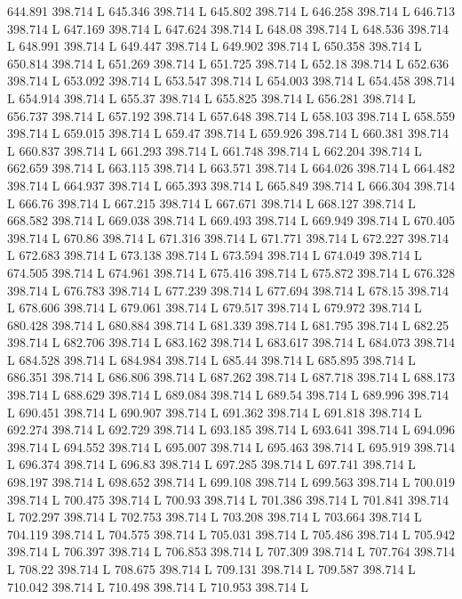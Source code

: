 644.891 398.714 L
645.346 398.714 L
645.802 398.714 L
646.258 398.714 L
646.713 398.714 L
647.169 398.714 L
647.624 398.714 L
648.08 398.714 L
648.536 398.714 L
648.991 398.714 L
649.447 398.714 L
649.902 398.714 L
650.358 398.714 L
650.814 398.714 L
651.269 398.714 L
651.725 398.714 L
652.18 398.714 L
652.636 398.714 L
653.092 398.714 L
653.547 398.714 L
654.003 398.714 L
654.458 398.714 L
654.914 398.714 L
655.37 398.714 L
655.825 398.714 L
656.281 398.714 L
656.737 398.714 L
657.192 398.714 L
657.648 398.714 L
658.103 398.714 L
658.559 398.714 L
659.015 398.714 L
659.47 398.714 L
659.926 398.714 L
660.381 398.714 L
660.837 398.714 L
661.293 398.714 L
661.748 398.714 L
662.204 398.714 L
662.659 398.714 L
663.115 398.714 L
663.571 398.714 L
664.026 398.714 L
664.482 398.714 L
664.937 398.714 L
665.393 398.714 L
665.849 398.714 L
666.304 398.714 L
666.76 398.714 L
667.215 398.714 L
667.671 398.714 L
668.127 398.714 L
668.582 398.714 L
669.038 398.714 L
669.493 398.714 L
669.949 398.714 L
670.405 398.714 L
670.86 398.714 L
671.316 398.714 L
671.771 398.714 L
672.227 398.714 L
672.683 398.714 L
673.138 398.714 L
673.594 398.714 L
674.049 398.714 L
674.505 398.714 L
674.961 398.714 L
675.416 398.714 L
675.872 398.714 L
676.328 398.714 L
676.783 398.714 L
677.239 398.714 L
677.694 398.714 L
678.15 398.714 L
678.606 398.714 L
679.061 398.714 L
679.517 398.714 L
679.972 398.714 L
680.428 398.714 L
680.884 398.714 L
681.339 398.714 L
681.795 398.714 L
682.25 398.714 L
682.706 398.714 L
683.162 398.714 L
683.617 398.714 L
684.073 398.714 L
684.528 398.714 L
684.984 398.714 L
685.44 398.714 L
685.895 398.714 L
686.351 398.714 L
686.806 398.714 L
687.262 398.714 L
687.718 398.714 L
688.173 398.714 L
688.629 398.714 L
689.084 398.714 L
689.54 398.714 L
689.996 398.714 L
690.451 398.714 L
690.907 398.714 L
691.362 398.714 L
691.818 398.714 L
692.274 398.714 L
692.729 398.714 L
693.185 398.714 L
693.641 398.714 L
694.096 398.714 L
694.552 398.714 L
695.007 398.714 L
695.463 398.714 L
695.919 398.714 L
696.374 398.714 L
696.83 398.714 L
697.285 398.714 L
697.741 398.714 L
698.197 398.714 L
698.652 398.714 L
699.108 398.714 L
699.563 398.714 L
700.019 398.714 L
700.475 398.714 L
700.93 398.714 L
701.386 398.714 L
701.841 398.714 L
702.297 398.714 L
702.753 398.714 L
703.208 398.714 L
703.664 398.714 L
704.119 398.714 L
704.575 398.714 L
705.031 398.714 L
705.486 398.714 L
705.942 398.714 L
706.397 398.714 L
706.853 398.714 L
707.309 398.714 L
707.764 398.714 L
708.22 398.714 L
708.675 398.714 L
709.131 398.714 L
709.587 398.714 L
710.042 398.714 L
710.498 398.714 L
710.953 398.714 L
